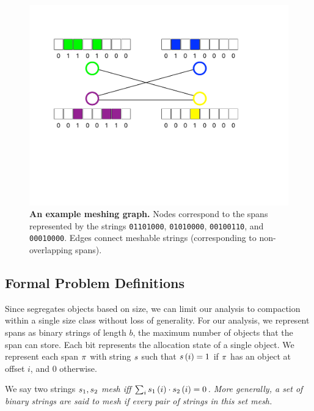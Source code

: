 \begin{figure}[!t]
  \centering
  \includegraphics[width=.8\textwidth]{Chapters/mesh/figures/graph-diagram.pdf}
\caption{\textbf{An example meshing graph.}  Nodes correspond to the spans represented by the strings \texttt{01101000}, \texttt{01010000}, \texttt{00100110}, and \texttt{00010000}.  Edges connect meshable strings (corresponding to non-overlapping spans).}\label{fig:exmesh}
\end{figure}


\subsection{Formal Problem Definitions}
\label{subsec:probdef}
Since \Mesh{} segregates objects based on size, we can limit our
analysis to compaction within a single size class without loss of
generality. For our analysis, we represent spans as binary strings of
length $b$, the maximum number of objects that the span can
store. Each bit represents the allocation state of a single object. We
represent each span $\pi$ with string $s$ such that $s\left(
i\right) = 1$ if $\pi$ has an object at offset $i$, and 0 otherwise.

\begin{definition}
We say  two  strings $s_{1}, s_{2}$ \em{mesh} iff $\sum_i s_{1}\left( i\right) \cdot s_{2} \left( i \right) = 0$. More generally, a set of binary strings are said to mesh if every pair of strings in this set mesh.
\end{definition}

